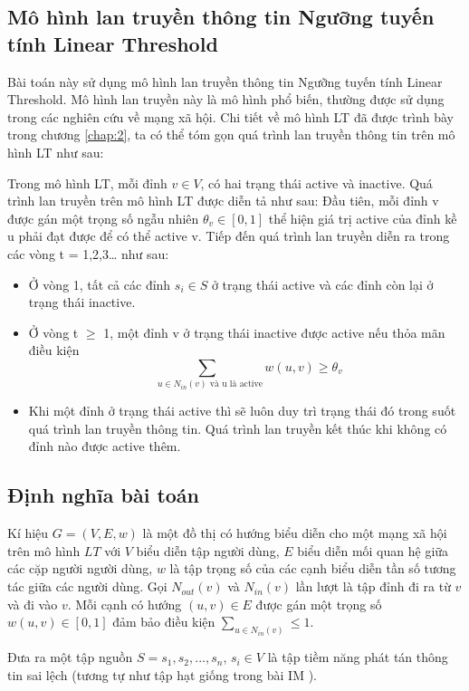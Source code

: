 \subsection{Mô hình lan truyền thông tin Ngưỡng tuyến tính Linear Threshold}
Bài toán này sử dụng mô hình lan truyền thông tin Ngưỡng tuyến tính Linear Threshold. Mô hình lan truyền này là mô hình phổ biến, thường được sử dụng trong các nghiên cứu về mạng xã hội. Chi tiết về mô hình LT đã được trình bày trong chương \ref{chap:2}, ta có thể tóm gọn quá trình lan truyền thông tin trên mô hình LT như sau:

Trong mô hình LT, mỗi đỉnh $v \in V$, có hai trạng thái active và inactive. Quá trình lan truyền trên mô hình LT được diễn tả như sau: Đầu tiên, mỗi đỉnh v được gán một trọng số ngẫu nhiên $\theta_{v} \in [0,1]$ thể hiện giá trị active của đỉnh kề u phải đạt được để có thể active v. Tiếp đến quá trình lan truyền diễn ra trong các vòng t = 1,2,3… như sau: 		
\begin {itemize}
\item Ở vòng 1, tất cả các đỉnh $s_{i} \in S$ ở trạng thái active và các đỉnh còn lại ở trạng thái inactive.

\item Ở vòng t $\ge$ 1, một đỉnh v ở trạng thái inactive được active nếu thỏa mãn điều kiện $$\sum_{\mbox{ $u \in N_{in}(v) $ và  u  là active}} w(u, v)\geq \theta_v$$

\item Khi một đỉnh ở trạng thái active thì sẽ luôn duy trì trạng thái đó trong suốt quá trình lan truyền thông tin. Quá trình lan truyền kết thúc khi không có đỉnh nào được active thêm.	
\end {itemize}

\subsection{Định nghĩa bài toán}
Kí hiệu $G = (V, E, w)$ là một đồ thị có hướng biểu diễn cho một mạng xã hội trên mô hình $LT$ với $V$ biểu diễn tập người dùng, $E$ biểu diễn mối quan hệ giữa các cặp người người dùng, $w$ là tập trọng số của các cạnh biểu diễn tần số tương tác giữa các người dùng. Gọi $N_{out}(v)$ và $N_{in}(v)$ lần lượt là tập đỉnh đi ra từ $v$ và đi vào $v$. Mỗi cạnh có hướng $(u,v) \in E$ được gán một trọng số $w(u,v) \in [0,1]$ đảm bảo điều kiện $\sum_{u \in N_{in}(v)} \leq 1$.

Đưa ra một tập nguồn $S = {s_{1}, s_{2}, ... , s_{n}}$, $s_{i} \in V$ là tập tiềm năng phát tán thông tin sai lệch (tương tự như tập hạt giống trong bài IM \cite{kemple2}).


